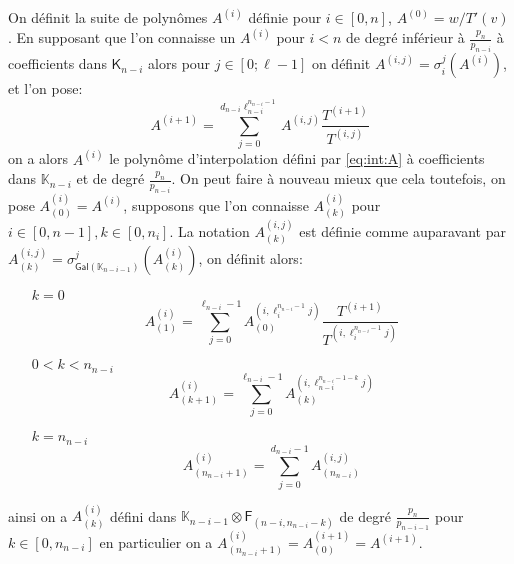 \documentclass[10pt,a4paper]{book}
\theoremstyle{plain}
\theoremstyle{definition}
\theoremstyle{definition}
\theoremstyle{definition}
\theoremstyle{definition}
\theoremstyle{remark}
\theoremstyle{remark}
\theoremstyle{definition}
\begin{document}
On définit la suite de polynômes $A^{(i)}$ 
 définie pour $i \in [0, n]$, $A^{(0)}=w/T'(v)$. En 
 supposant que l'on connaisse un $A^{(i)}$ pour $i < n$ de degré inférieur à $\frac{p_n}{p_{n-i}}$ à 
 coefficients dans $\mathsf{K}_{n-i}$ alors pour $j \in [0 ; \ell-1]$ on définit
 $A^{(i,j)}=\sigma_i^j(A^{(i)})$, et l'on pose:  
\begin{equation*}
A^{(i+1)}=\sum_{j=0}^{d_{n-i}\ell_{n-i}^{n_{n-i}-1}}A^{(i,j)}\frac{T^{(i+1)}}{T^{(i,j)}} 
\end{equation*}
on a alors $A^{(i)}$ le polynôme d'interpolation défini par \ref{eq:int:A} 
à coefficients dans $\mathbb{K}_{n-i}$ et de degré $\frac{p_n}{p_{n-i}}$.
On peut faire à nouveau mieux que cela toutefois, on pose
$A^{(i)}_{(0)}=A^{(i)}$, supposons que l'on connaisse  $A^{(i)}_{(k)}$ pour 
$i \in [0,n-1], k \in [0,n_i]$. La notation $A^{(i,j)}_{(k)}$ est définie comme
 auparavant par $A^{(i,j)}_{(k)}=\sigma^j_{\mathsf{Gal}(\mathbb{K}_{n-i-1})}
 (A^{(i)}_{(k)})$, on définit alors:
 \begin{itemize}
 \item[$k=0$]
 \[
A^{(i)}_{(1)}=\sum_{j=0}^{\ell_{n-i}-1 }A^{(i,\ell_{i}^{n_{n-i}-1}j)}_{(0)}\frac{T^{(i+1)}}{T^{(i,\ell_{i}^{n_{n-i}-1}j)}}  \]
\item[$0<k<n_{n-i}$]
\[
A^{(i)}_{(k+1)}=\sum_{j=0}^{\ell_{n-i}-1 }A^{(i,\ell_{n-i}^{n_{n-i}-1-k}j)}_{(k)}  \]
 \item[$k=n_{n-i}$] \[
 A^{(i)}_{(n_{n-i}+1)}=\sum_{j=0}^{d_{n-i}-1} A^{(i,j)}_{(n_{n-i})}  
  \]
 \end{itemize}
ainsi on a $A^{(i)}_{(k)}$ défini dans $\mathbb{K}_{n-i-1} \otimes \mathsf{F}_{(n-i,n_{n-i}-k)}$
de degré $\frac{p_n}{p_{n-i-1}}$ pour $k \in [0,n_{n-i}]$ en 
particulier on a $A^{(i)}_{(n_{n-i}+1)}=A^{(i+1)}_{(0)}=A^{(i+1)}$.  
\end{document}
